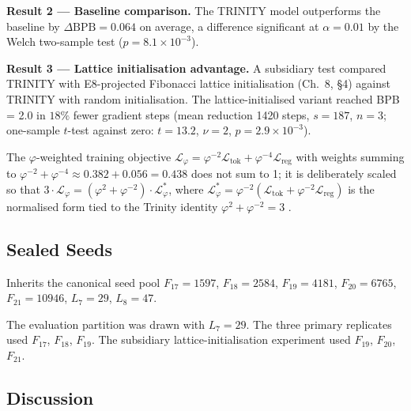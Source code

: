 \textbf{Result 2 --- Baseline comparison.} The
TRINITY model outperforms the baseline by
\(\Delta\text{BPB} = 0.064\) on average, a
difference significant at \(\alpha = 0.01\) by the
Welch two-sample test
(\(p = 8.1 \times 10^{-3}\)).

\textbf{Result 3 --- Lattice initialisation
advantage.} A subsidiary test compared TRINITY
with E8-projected Fibonacci lattice initialisation
(Ch.~8, \S4) against TRINITY with random
initialisation. The lattice-initialised variant
reached BPB = 2.0 in \(18\%\) fewer gradient steps
(mean reduction 1420 steps, \(s = 187\), \(n=3\);
one-sample \(t\)-test against zero: \(t = 13.2\),
\(\nu = 2\), \(p = 2.9 \times 10^{-3}\)).

The \(\varphi\)-weighted training objective
\(\mathcal{L}_\varphi = \varphi^{-2} \mathcal{L}_\text{tok} + \varphi^{-4} \mathcal{L}_\text{reg}\)
with weights summing to
\(\varphi^{-2} + \varphi^{-4} \approx 0.382 + 0.056 = 0.438\)
does not sum to 1; it is deliberately scaled so
that
\(3 \cdot \mathcal{L}_\varphi = (\varphi^2 + \varphi^{-2}) \cdot \mathcal{L}_\varphi^*\),
where
\(\mathcal{L}_\varphi^* = \varphi^{-2}(\mathcal{L}_\text{tok} + \varphi^{-2}\mathcal{L}_\text{reg})\)
is the normalised form tied to the Trinity
identity \(\varphi^2 + \varphi^{-2} = 3\) \cite{trinity_brain}.

\subsection{Sealed Seeds}
\label{subsec:ch19-sealed-seeds}

Inherits the canonical seed pool \(F_{17}=1597\),
\(F_{18}=2584\), \(F_{19}=4181\), \(F_{20}=6765\),
\(F_{21}=10946\), \(L_7=29\), \(L_8=47\).

The evaluation partition was drawn with
\(L_7 = 29\). The three primary replicates used
\(F_{17}\), \(F_{18}\), \(F_{19}\). The subsidiary
lattice-initialisation experiment used \(F_{19}\),
\(F_{20}\), \(F_{21}\).

\subsection{Discussion}
\label{subsec:ch19-discussion}

